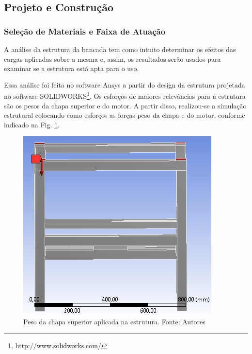 \subsection{Projeto e Construção}


\subsubsection*{\textbf{Seleção de Materiais e Faixa de Atuação}}





    A análise da estrutura da bancada tem como intuito determinar os efeitos das cargas aplicadas sobre a mesma e, assim, os resultados serão usados para examinar se a estrutura está apta para o uso.

    Essa análise foi feita no software Ansys a partir do design da estrutura projetada no software SOLIDWORKS\footnote{http://www.solidworks.com/}. Os esforços de maiores relevâncias para a estrutura são os pesos da chapa superior e do motor. A partir disso, realizou-se a simulação estrutural colocando como esforços as forças peso da chapa e do motor, conforme indicado na Fig. \ref{fig:an_estrutural}.

  \begin{figure}[H]
      \centering
      \includegraphics[scale=0.7]{figuras/an_estrutural.png}
      \caption{Peso da chapa superior aplicada na estrutura. Fonte: Autores}
      \label{fig:an_estrutural}
      \end{figure}

